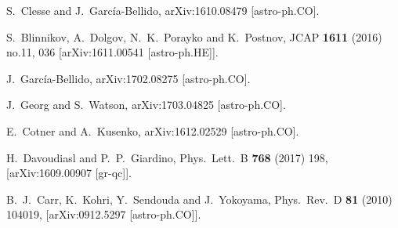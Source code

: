 \begin{thebibliography}{10}
  S.~Clesse and J.~García-Bellido,
  arXiv:1610.08479 [astro-ph.CO].

  S.~Blinnikov, A.~Dolgov, N.~K.~Porayko and K.~Postnov,
  JCAP {\bf 1611} (2016) no.11,  036
  [arXiv:1611.00541 [astro-ph.HE]].

  J.~García-Bellido,
  arXiv:1702.08275 [astro-ph.CO].


  J.~Georg and S.~Watson,
  arXiv:1703.04825 [astro-ph.CO].


  E.~Cotner and A.~Kusenko,
  arXiv:1612.02529 [astro-ph.CO].


  H.~Davoudiasl and P.~P.~Giardino,
  Phys.\ Lett.\ B {\bf 768} (2017) 198,
  [arXiv:1609.00907 [gr-qc]].


  B.~J.~Carr, K.~Kohri, Y.~Sendouda and J.~Yokoyama,
  Phys.\ Rev.\ D {\bf 81} (2010) 104019,
  [arXiv:0912.5297 [astro-ph.CO]].



\end{thebibliography}
